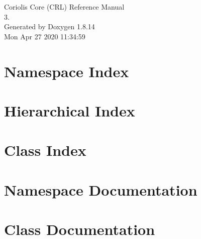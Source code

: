 \documentclass[a4paper]{socbook}
\begin{document}
   \begin{titlepage}
     \vspace*{7cm}
     \begin{center}
     {\Large Coriolis Core (\+C\+R\+L) Reference Manual\\[1ex]\large 3. }\\
     \vspace*{1cm}
     {\large Generated by Doxygen 1.8.14}\\
     \vspace*{0.5cm}
     {\small Mon Apr 27 2020 11:34:59}\\
     \end{center}
   \end{titlepage}

   \clearemptydoublepage

   \tableofcontents
   \clearemptydoublepage

\chapter{Namespace Index}

\chapter{Hierarchical Index}

\chapter{Class Index}

\chapter{Namespace Documentation}


\chapter{Class Documentation}















\backmatter
\newpage
{}
\clearemptydoublepage
{}
\printindex
\end{document}
